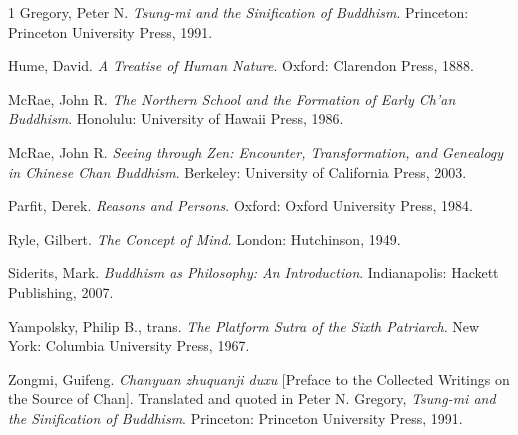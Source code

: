 \begin{hangparas}{\hangingindent}{1}
  Gregory, Peter N. \emph{Tsung-mi and the Sinification of Buddhism}.
  Princeton: Princeton University Press, 1991.


  Hume, David. \emph{A Treatise of Human Nature}. Oxford: Clarendon
  Press, 1888.


  McRae, John R. \emph{The Northern School and the Formation of Early
  Ch'an Buddhism}. Honolulu: University of Hawaii Press, 1986.


  McRae, John R. \emph{Seeing through Zen: Encounter, Transformation,
  and Genealogy in Chinese Chan Buddhism}. Berkeley: University of
  California Press, 2003.


  Parfit, Derek. \emph{Reasons and Persons}. Oxford: Oxford University
  Press, 1984.


  Ryle, Gilbert. \emph{The Concept of Mind}. London: Hutchinson, 1949.


  Siderits, Mark. \emph{Buddhism as Philosophy: An Introduction}.
  Indianapolis: Hackett Publishing, 2007.


  Yampolsky, Philip B., trans. \emph{The Platform Sutra of the Sixth
  Patriarch}. New York: Columbia University Press, 1967.


  Zongmi, Guifeng. \emph{Chanyuan zhuquanji duxu} {[}Preface to the
  Collected Writings on the Source of Chan{]}. Translated and quoted in
  Peter N. Gregory, \emph{Tsung-mi and the Sinification of Buddhism}.
  Princeton: Princeton University Press, 1991.
\end{hangparas}